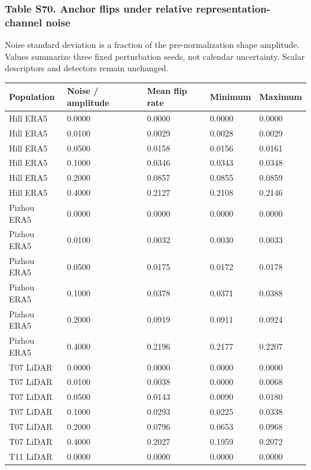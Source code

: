 \documentclass[a4paper,11pt]{article}
\newcounter{none}
\begin{document}
\subsubsection{Table S70. Anchor flips under relative representation-channel noise}\label{table-s70.-anchor-flips-under-relative-representation-channel-noise}

Noise standard deviation is a fraction of the pre-normalization shape amplitude. Values summarize three fixed perturbation seeds, not calendar uncertainty. Scalar descriptors and detectors remain unchanged.

{\def\LTcaptype{none} %
\begin{longtable}[]{@{}lllll@{}}
\toprule\noalign{}
Population & Noise / amplitude & Mean flip rate & Minimum & Maximum \\
\midrule\noalign{}
\endhead
\bottomrule\noalign{}
\endlastfoot
Hill ERA5 & 0.0000 & 0.0000 & 0.0000 & 0.0000 \\
Hill ERA5 & 0.0100 & 0.0029 & 0.0028 & 0.0029 \\
Hill ERA5 & 0.0500 & 0.0158 & 0.0156 & 0.0161 \\
Hill ERA5 & 0.1000 & 0.0346 & 0.0343 & 0.0348 \\
Hill ERA5 & 0.2000 & 0.0857 & 0.0855 & 0.0859 \\
Hill ERA5 & 0.4000 & 0.2127 & 0.2108 & 0.2146 \\
Pizhou ERA5 & 0.0000 & 0.0000 & 0.0000 & 0.0000 \\
Pizhou ERA5 & 0.0100 & 0.0032 & 0.0030 & 0.0033 \\
Pizhou ERA5 & 0.0500 & 0.0175 & 0.0172 & 0.0178 \\
Pizhou ERA5 & 0.1000 & 0.0378 & 0.0371 & 0.0388 \\
Pizhou ERA5 & 0.2000 & 0.0919 & 0.0911 & 0.0924 \\
Pizhou ERA5 & 0.4000 & 0.2196 & 0.2177 & 0.2207 \\
T07 LiDAR & 0.0000 & 0.0000 & 0.0000 & 0.0000 \\
T07 LiDAR & 0.0100 & 0.0038 & 0.0000 & 0.0068 \\
T07 LiDAR & 0.0500 & 0.0143 & 0.0090 & 0.0180 \\
T07 LiDAR & 0.1000 & 0.0293 & 0.0225 & 0.0338 \\
T07 LiDAR & 0.2000 & 0.0796 & 0.0653 & 0.0968 \\
T07 LiDAR & 0.4000 & 0.2027 & 0.1959 & 0.2072 \\
T11 LiDAR & 0.0000 & 0.0000 & 0.0000 & 0.0000 \\

\end{longtable}}
\end{document}
